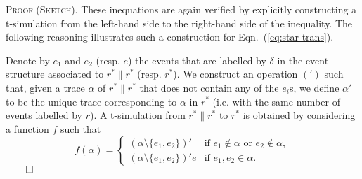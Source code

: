 \documentclass[review]{elsart}
\newenvironment{proofsummary}{\par
\noindent
\textsc{Proof (Sketch). }
\noindent}{\hfill\(\qed\)}
\newcommand{\bks}{*}
\newcommand{\Eqn}[1]{Eqn.~(\ref{#1})}
\begin{document}
\begin{proofsummary}
  These inequations are again verified by explicitly constructing a t-simulation from the left-hand side to the right-hand side of the inequality. The following reasoning illustrates such a construction for \Eqn{eq:star-trans}.

  Denote by $e_1$ and $e_2$ (resp. $e$) the events that are labelled by $\delta$ in the event structure associated to $r^{\bks}\|r^{\bks}$ (resp. $r^{\bks}$). We construct an operation $(')$ such that, given a trace $\alpha$ of $r^{\bks}\|r^{\bks}$ that does not contain any of the $e_i$s, we define $\alpha'$ to be the unique trace corresponding to $\alpha$ in $r^{\bks}$ (i.e. with the same number of events labelled by $r$). A t-simulation from $r^{\bks}\|r^{\bks}$ to $r^{\bks}$ is obtained by considering a function $f$ such that \begin{displaymath} f(\alpha) = \begin{cases}
      (\alpha{\setminus}\{e_1,e_2\})' & \textrm{if } e_1{\notin}\alpha\textrm{ or }e_2{\notin}\alpha,\\
      (\alpha{\setminus}\{e_1,e_2\})'e & \textrm{if } e_1,e_2{\in}\alpha.\end{cases} \end{displaymath} \end{proofsummary}
\end{document}
